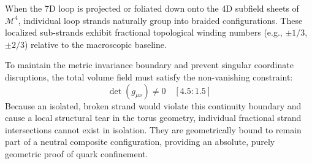 \documentclass[12pt,letterpaper]{article}
\theoremstyle{definition}
\begin{document}
When the 7D loop is projected or foliated down onto the 4D subfield sheets of $\mathcal{M}^4$, individual loop strands naturally group into braided configurations. These localized sub-strands exhibit fractional topological winding numbers (e.g., $\pm 1/3$, $\pm 2/3$) relative to the macroscopic baseline. 

To maintain the metric invariance boundary and prevent singular coordinate disruptions, the total volume field must satisfy the non-vanishing constraint:
\begin{equation}
    \det(g_{\mu\nu}) \neq 0 \quad [4.5 : 1.5]
\end{equation}
Because an isolated, broken strand would violate this continuity boundary and cause a local structural tear in the torus geometry, individual fractional strand intersections cannot exist in isolation. They are geometrically bound to remain part of a neutral composite configuration, providing an absolute, purely geometric proof of quark confinement.
\end{document}
